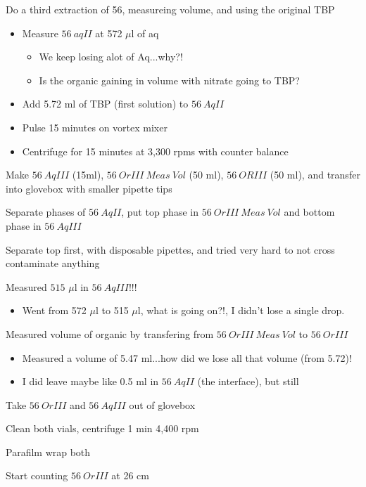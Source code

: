 \documentclass[idxtotoc,hyperref,openany,oneside]{labbook} %
\newcommand{\cmark}{\ding{51}}%
\newcommand{\done}{\rlap{$\square$}{\raisebox{2pt}{\large\hspace{1pt}\cmark}}%
  \hspace{-2.5pt}}
\begin{document}

\begin{todolist}
\item[\done]{Do a third extraction of 56, measureing volume,
  and using the original TBP}
  \begin{itemize}
  \item{Measure $\boxed{56\ aqII}$ at 572 $\mu$l of aq}
    \begin{itemize}
    \item{We keep losing alot of Aq...why?!}
    \item{Is the organic gaining in volume with nitrate going to
    TBP?}
    \end{itemize}
  \item{Add 5.72 ml of TBP (first solution) to $\boxed{56\ AqII}$}
  \item{Pulse 15 minutes on vortex mixer}
  \item{Centrifuge for 15 minutes at 3,300 rpms with counter balance}
  \end{itemize}
\item[\done]{Make $\boxed{56\ AqIII}$ (15ml),
  $\boxed{56\ OrIII\ Meas\ Vol}$ (50 ml),
  $\boxed{56\ ORIII}$ (50 ml), and transfer into glovebox with smaller
  pipette tips}
\item[\done]{Separate phases of $\boxed{56\ AqII}$, put top phase
  in $\boxed{56\ OrIII\ Meas\ Vol}$ and bottom phase in
  $\boxed{56\ AqIII}$}
\item[\done]{Separate top first, with disposable pipettes, and tried
very hard to not cross contaminate anything}
\item[\done]{Measured $\boxed{515}$ $\mu$l
  in $\boxed{56\ AqIII}$!!!}
  \begin{itemize}
  \item{Went from 572 $\mu$l to 515 $\mu$l, what is going on?!,
  I didn't lose a single drop.}
  \end{itemize}
\item[\done]{Measured volume of organic by transfering from
  $\boxed{56\ OrIII\ Meas\ Vol}$ to $\boxed{56\ OrIII}$}
  \begin{itemize}
  \item{Measured a volume of 5.47 ml...how did we lose all that
    volume (from 5.72)!}
  \item{I did leave maybe like 0.5 ml in $\boxed{56\ AqII}$
    (the interface), but still}
  \end{itemize}
\item[\done]{Take $\boxed{56\ OrIII}$ and $\boxed{56\ AqIII}$
  out of glovebox}
\item[\done]{Clean both vials, centrifuge 1 min 4,400 rpm}
\item[\done]{Parafilm wrap both}
\item[\done]{Start counting $\boxed{56\ OrIII}$ at 26 cm}
\end{todolist}
\end{document}
